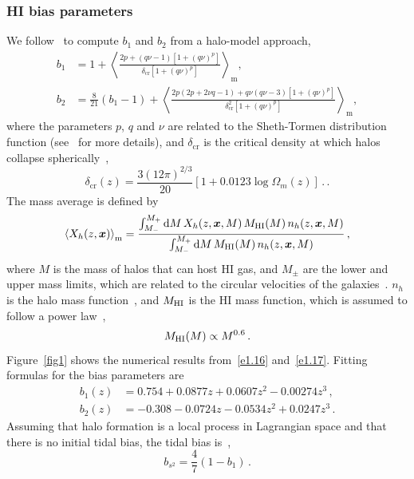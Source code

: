 \subsubsection{HI bias parameters} 
We follow~\cite{Umeh:2015gza} to compute $b_1$ and $b_2$ from a halo-model approach,
\begin{align}
b_1 &= 1 + \left\langle \frac{2 p +\left(q\nu - 1\right)\left[1+(q\nu)^{p}\right]}{\delta_\mathrm{cr}\left[1+(q\nu)^{p}\right]} \right\rangle _\mathrm{\!\!\! m}  \!\!, \label{e1.16} \\
b_2 &= \frac{8}{21}\left(b_{1}-1\right) + \left \langle \frac{2 p \left(2p+2\nu q-1\right)+ q\nu\left(q\nu-3\right)\left[1+(q\nu)^{p}\right]}{\delta_\mathrm{cr}^{2}\left[1+(q\nu)^{p}\right]}  \right \rangle _\mathrm{\!\!\! m}  \!\!, \label{e1.17}
\end{align}
where the parameters $p$, $q$ and $\nu$ are related to the Sheth-Tormen distribution function (see~\cite{Sheth:1999su, Sheth:2001dp, Sheth:1999mn} for more details), and $\delta_\mathrm{cr}$ is the critical density at which halos collapse spherically~\cite{Kitayama:1996ne}, 
\begin{equation}
\delta_\mathrm{cr}(z) = \frac{3(12\pi)^{2/3}}{20} \left[1+0.0123\log{\Omega_m (z)}\right] \,. \label{e1.20}\,.
\end{equation}
The mass average is defined by 
\begin{equation}
\left\langle X_{h}(z,\bm{x}) \right\rangle _\mathrm{m}  = \frac{\int_{M_{-}}^{M_{+}} \mathrm{d} M\,X_{h}(z,\bm{x},M)\,M_{{\mathrm{HI}}}(M)\,n_{h}(z,\bm{x},M)}{\int_{M_{-}}^{M_{+}} \mathrm{d} M\,M_{{\mathrm{HI}}}(M)\,n_{h}(z,\bm{x},M)} \, , \label{e1.18}
\end{equation}
where $M$ is the mass of halos that can host HI gas, and $M_{\pm}$ are the lower and upper mass limits, which are related to the circular velocities  of the galaxies~\citep{Bull:2014rha}. $n_{h}$ is the halo mass function~\citep{Sheth:1999su, Sheth:2001dp,Tellarini:2015faa}, and $M_{{\mathrm{HI}}}$ is the HI mass function, which is assumed to follow a power law~\citep{Santos:2015gra},
\begin{equation}
M_{{\mathrm{HI}}}(M) \propto M^{0.6} \,. \label{e1.19}
\end{equation}
Figure~\ref{fig1} shows the numerical results from~\eqref{e1.16} and~\eqref{e1.17}. Fitting formulas for the bias parameters are
\begin{align}
b_1(z) &=  0.754 + 0.0877z + 0.0607z^2 - 0.00274z^3\,, \label{e1.27} \\
b_2(z) &=  -0.308 - 0.0724z - 0.0534z^2 + 0.0247z^3\,. \label{e1.28}
\end{align}
Assuming that halo formation is a local process in Lagrangian space and that there is no initial tidal bias, the tidal bias is~\cite{Tellarini:2015faa},
\begin{equation}
b_{s^{2}} = \frac{4}{7}\left(1-b_{1}\right)\,.\label{e1.21}
\end{equation} 
%


